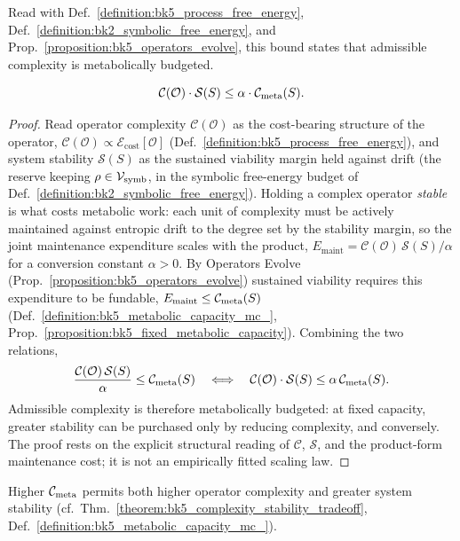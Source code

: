 \begin{theorem} \label{theorem:bk5_complexity_stability_tradeoff}
\leavevmode\newline
Read with Def.~\ref{definition:bk5_process_free_energy},
Def.~\ref{definition:bk2_symbolic_free_energy}, and
Prop.~\ref{proposition:bk5_operators_evolve}, this bound states that
admissible complexity is metabolically budgeted.

\[
\mathcal{C}(\mathcal{O}) \cdot \mathcal{S}(S) \leq \alpha \cdot \mathcal{C}_{\text{meta}}(S).
\]
\end{theorem}
\begin{proof}
\label{proof:bk5_complexity_stability_tradeoff}
\leavevmode
Read operator complexity $\mathcal{C}(\mathcal{O})$ as the cost-bearing structure of the operator, $\mathcal{C}(\mathcal{O})\propto\mathcal{E}_{\text{cost}}[\mathcal{O}]$ (Def.~\ref{definition:bk5_process_free_energy}), and system stability $\mathcal{S}(S)$ as the sustained viability margin held against drift (the reserve keeping $\rho\in\mathcal{V}_{\mathrm{symb}}$, in the symbolic free-energy budget of Def.~\ref{definition:bk2_symbolic_free_energy}). Holding a complex operator \emph{stable} is what costs metabolic work: each unit of complexity must be actively maintained against entropic drift to the degree set by the stability margin, so the joint maintenance expenditure scales with the product, $E_{\text{maint}}=\mathcal{C}(\mathcal{O})\,\mathcal{S}(S)/\alpha$ for a conversion constant $\alpha>0$. By Operators Evolve (Prop.~\ref{proposition:bk5_operators_evolve}) sustained viability requires this expenditure to be fundable, $E_{\text{maint}}\le\mathcal{C}_{\text{meta}}(S)$ (Def.~\ref{definition:bk5_metabolic_capacity_mc_}, Prop.~\ref{proposition:bk5_fixed_metabolic_capacity}). Combining the two relations,
\[
\frac{\mathcal{C}(\mathcal{O})\,\mathcal{S}(S)}{\alpha}\le\mathcal{C}_{\text{meta}}(S)\quad\Longleftrightarrow\quad \mathcal{C}(\mathcal{O})\cdot\mathcal{S}(S)\le\alpha\,\mathcal{C}_{\text{meta}}(S).
\]
Admissible complexity is therefore metabolically budgeted: at fixed capacity, greater stability can be purchased only by reducing complexity, and conversely. The proof rests on the explicit structural reading of $\mathcal{C}$, $\mathcal{S}$, and the product-form maintenance cost; it is not an empirically fitted scaling law.
\end{proof}
\begin{corollary}
\label{corollary:bk5_complexity_stability_tradeoff}
Higher $\mathcal{C}_{\text{meta}}$ permits both higher operator complexity and greater system stability (cf.~Thm.~\ref{theorem:bk5_complexity_stability_tradeoff}, Def.~\ref{definition:bk5_metabolic_capacity_mc_}).
\end{corollary}
